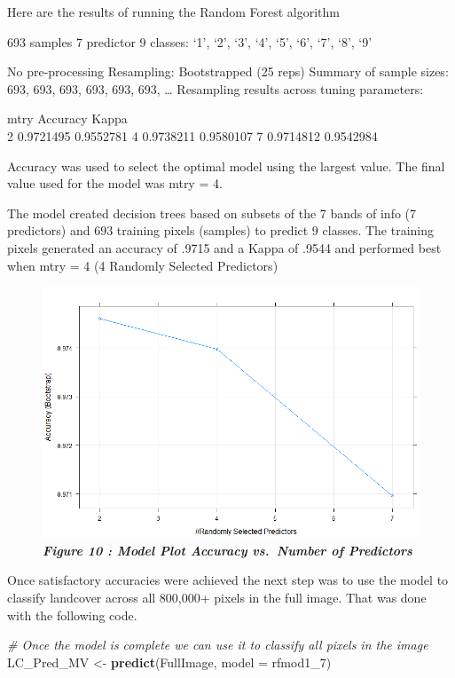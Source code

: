 \documentclass[]{article}
\newenvironment{Shaded}{\begin{snugshade}}{\end{snugshade}}
\newcommand{\KeywordTok}[1]{\textcolor[rgb]{0.13,0.29,0.53}{\textbf{#1}}}
\newcommand{\DataTypeTok}[1]{\textcolor[rgb]{0.13,0.29,0.53}{#1}}
\newcommand{\DecValTok}[1]{\textcolor[rgb]{0.00,0.00,0.81}{#1}}
\newcommand{\StringTok}[1]{\textcolor[rgb]{0.31,0.60,0.02}{#1}}
\newcommand{\CommentTok}[1]{\textcolor[rgb]{0.56,0.35,0.01}{\textit{#1}}}
\newcommand{\NormalTok}[1]{#1}
\begin{document}
Here are the results of running the Random Forest algorithm

693 samples 7 predictor 9 classes: `1', `2', `3', `4', `5', `6', `7',
`8', `9'

No pre-processing Resampling: Bootstrapped (25 reps) Summary of sample
sizes: 693, 693, 693, 693, 693, 693, \ldots{} Resampling results across
tuning parameters:

mtry Accuracy Kappa\\
2 0.9721495 0.9552781 4 0.9738211 0.9580107 7 0.9714812 0.9542984

Accuracy was used to select the optimal model using the largest value.
The final value used for the model was mtry = 4.

The model created decision trees based on subsets of the 7 bands of info
(7 predictors) and 693 training pixels (samples) to predict 9 classes.
The training pixels generated an accuracy of .9715 and a Kappa of .9544
and performed best when mtry = 4 (4 Randomly Selected Predictors)

\begin{figure}
\centering
\includegraphics{images/modelPlot.png}
\caption{\textbf{\emph{Figure 10 : Model Plot Accuracy vs.~Number of
Predictors}}}
\end{figure}

Once satisfactory accuracies were achieved the next step was to use the
model to classify landcover across all 800,000+ pixels in the full
image. That was done with the following code.

\begin{Shaded}
\begin{Highlighting}[]
\CommentTok{# Once the model is complete we can use it to classify all pixels in the image}
\NormalTok{LC_Pred_MV <-}\StringTok{ }\KeywordTok{predict}\NormalTok{(FullImage, }\DataTypeTok{model =}\NormalTok{ rfmod1_}\DecValTok{7}\NormalTok{)}
\end{Highlighting}
\end{Shaded}
\end{document}
